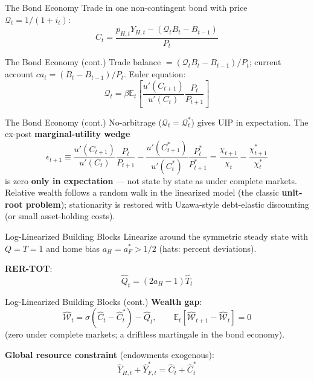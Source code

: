 \documentclass[blue]{beamer}
\newcommand{\E}{\mathbb{E}}
\begin{document}
\begin{frame}{The Bond Economy}
Trade in one non-contingent bond with price $\mathcal{Q}_t = 1/(1+i_t)$:
\[
C_t = \frac{p_{H,t}Y_{H,t} - (\mathcal{Q}_tB_t - B_{t-1})}{P_t}
\]

\end{frame}

\begin{frame}{The Bond Economy (cont.)}
Trade balance $= (\mathcal{Q}_tB_t - B_{t-1})/P_t$; current account $ca_t = (B_t - B_{t-1})/P_t$. Euler equation:
\[
\mathcal{Q}_t = \beta\E_t\left[\frac{u'(C_{t+1})}{u'(C_t)}\frac{P_t}{P_{t+1}}\right]
\]

\end{frame}

\begin{frame}{The Bond Economy (cont.)}
No-arbitrage ($\mathcal{Q}_t = \mathcal{Q}_t^*$) gives UIP in expectation. The ex-post \textbf{marginal-utility wedge}
\[
\epsilon_{t+1} \equiv \frac{u'(C_{t+1})}{u'(C_t)}\frac{P_t}{P_{t+1}} - \frac{u'(C^*_{t+1})}{u'(C_t^*)}\frac{P_t^*}{P^*_{t+1}} = \frac{\chi_{t+1}}{\chi_t} - \frac{\chi^*_{t+1}}{\chi_t^*}
\]
is zero \textbf{only in expectation} --- not state by state as under complete markets. Relative wealth follows a random walk in the linearized model (the classic \textbf{unit-root problem}); stationarity is restored with Uzawa-style debt-elastic discounting (or small asset-holding costs).
\end{frame}

\begin{frame}{Log-Linearized Building Blocks}
Linearize around the symmetric steady state with $Q = T = 1$ and home bias $a_H = a_F^* > 1/2$ (hats: percent deviations).

\bigskip
\textbf{RER-TOT}:
\[
\hat{Q}_t = (2a_H - 1)\hat{T}_t
\]

\end{frame}

\begin{frame}{Log-Linearized Building Blocks (cont.)}
\textbf{Wealth gap}:
\[
\hat{\mathcal{W}}_t = \sigma(\hat{C}_t - \hat{C}_t^*) - \hat{Q}_t, \qquad \E_t[\hat{\mathcal{W}}_{t+1} - \hat{\mathcal{W}}_t] = 0
\]
(zero under complete markets; a driftless martingale in the bond economy).

\bigskip
\textbf{Global resource constraint} (endowments exogenous):
\[
\hat{Y}_{H,t} + \hat{Y}^*_{F,t} = \hat{C}_t + \hat{C}_t^*
\]
\end{frame}
\end{document}
